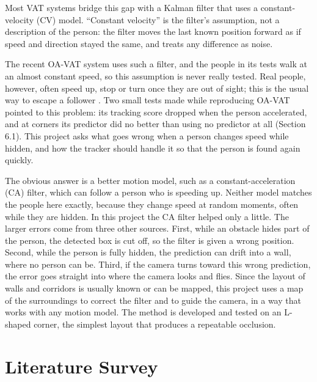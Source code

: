 \documentclass[12pt,a4paper]{article}
\begin{document}
Most VAT systems bridge this gap with a Kalman filter that uses a constant-velocity (CV) model.
``Constant velocity'' is the filter's assumption, not a description of the person: the filter moves the last known position forward as if speed and direction stayed the same, and treats any difference as noise.

The recent OA-VAT system \cite{r3} uses such a filter, and the people in its tests walk at an almost constant speed, so this assumption is never really tested.
Real people, however, often speed up, stop or turn once they are out of sight; this is the usual way to escape a follower \cite{r4}.
Two small tests made while reproducing OA-VAT pointed to this problem: its tracking score dropped when the person accelerated, and at corners its predictor did no better than using no predictor at all (Section 6.1).
This project asks what goes wrong when a person changes speed while hidden, and how the tracker should handle it so that the person is found again quickly.

The obvious answer is a better motion model, such as a constant-acceleration (CA) filter, which can follow a person who is speeding up.
Neither model matches the people here exactly, because they change speed at random moments, often while they are hidden.
In this project the CA filter helped only a little.
The larger errors come from three other sources.
First, while an obstacle hides part of the person, the detected box is cut off, so the filter is given a wrong position.
Second, while the person is fully hidden, the prediction can drift into a wall, where no person can be.
Third, if the camera turns toward this wrong prediction, the error goes straight into where the camera looks and flies.
Since the layout of walls and corridors is usually known or can be mapped, this project uses a map of the surroundings to correct the filter and to guide the camera, in a way that works with any motion model.
The method is developed and tested on an L-shaped corner, the simplest layout that produces a repeatable occlusion.

\section{Literature Survey}
\end{document}
